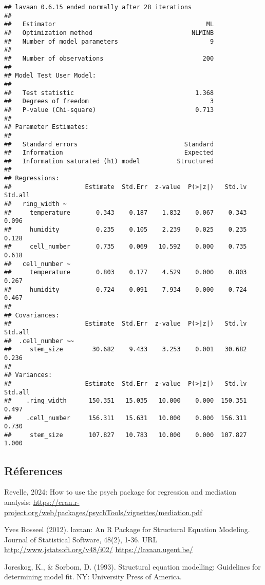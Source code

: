 \documentclass[
]{article}
\begin{document}
\begin{verbatim}
## lavaan 0.6.15 ended normally after 28 iterations
## 
##   Estimator                                         ML
##   Optimization method                           NLMINB
##   Number of model parameters                         9
## 
##   Number of observations                           200
## 
## Model Test User Model:
##                                                       
##   Test statistic                                 1.368
##   Degrees of freedom                                 3
##   P-value (Chi-square)                           0.713
## 
## Parameter Estimates:
## 
##   Standard errors                             Standard
##   Information                                 Expected
##   Information saturated (h1) model          Structured
## 
## Regressions:
##                    Estimate  Std.Err  z-value  P(>|z|)   Std.lv  Std.all
##   ring_width ~                                                          
##     temperature       0.343    0.187    1.832    0.067    0.343    0.096
##     humidity          0.235    0.105    2.239    0.025    0.235    0.128
##     cell_number       0.735    0.069   10.592    0.000    0.735    0.618
##   cell_number ~                                                         
##     temperature       0.803    0.177    4.529    0.000    0.803    0.267
##     humidity          0.724    0.091    7.934    0.000    0.724    0.467
## 
## Covariances:
##                    Estimate  Std.Err  z-value  P(>|z|)   Std.lv  Std.all
##  .cell_number ~~                                                        
##     stem_size        30.682    9.433    3.253    0.001   30.682    0.236
## 
## Variances:
##                    Estimate  Std.Err  z-value  P(>|z|)   Std.lv  Std.all
##    .ring_width      150.351   15.035   10.000    0.000  150.351    0.497
##    .cell_number     156.311   15.631   10.000    0.000  156.311    0.730
##     stem_size       107.827   10.783   10.000    0.000  107.827    1.000
\end{verbatim}

\hypertarget{ruxe9ferences}{%
\subsection{Réferences}\label{ruxe9ferences}}

Revelle, 2024: How to use the psych package for regression and mediation
analysis:
\url{https://cran.r-project.org/web/packages/psychTools/vignettes/mediation.pdf}

Yves Rosseel (2012). lavaan: An R Package for Structural Equation
Modeling. Journal of Statistical Software, 48(2), 1-36. URL
\url{http://www.jstatsoft.org/v48/i02/} \url{https://lavaan.ugent.be/}

Joreskog, K., \& Sorbom, D. (1993). Structural equation modelling:
Guidelines for determining model fit. NY: University Press of America.
\end{document}
